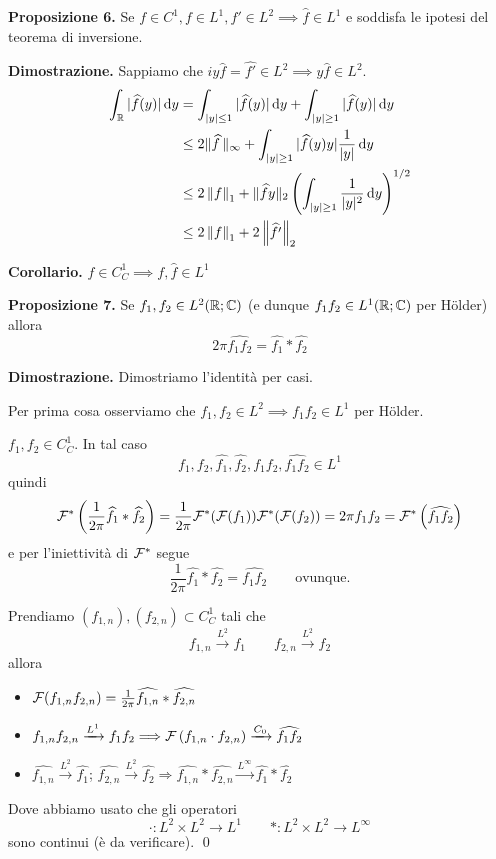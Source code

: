 \newpage

\textbf{Proposizione 6.}
Se $f \in C^1, f \in L^1, f' \in L^2 \implies \hat f \in L^1$ e soddisfa le ipotesi del teorema di inversione.

\textbf{Dimostrazione.}
Sappiamo che $iy \hat f = \hat{f'} \in L^2 \implies y \hat f \in L^2$.
$$
\begin{aligned}
	\int_{\mathbb R} |\widehat f(y)| \,\mathrm{d} y 
	& = \int_{|y| \leq 1} |\widehat f(y)| \,\mathrm{d} y + \int_{|y| \geq 1} |\widehat f(y)| \,\mathrm{d} y \\
	& \leq 2 \| \widehat f\, \|_\infty + \int_{|y| \geq 1} |\widehat f(y) y| \frac{1}{|y|} \,\mathrm{d} y \\
	& \leq 2 \left\lVert f \right\rVert_1 + \| \widehat f y \|_2 \left( \int_{|y| \geq 1} \frac{1}{|y|^2} \,\mathrm{d} y \right)^{1/2} \\
	& \leq 2 \left\lVert f \right\rVert_1 + 2 \left\lVert \widehat{f'} \right\rVert_2
\end{aligned}
$$

\textbf{Corollario.}
$f \in C_C^1 \implies f, \hat f \in L^1$

\textbf{Proposizione 7.}
Se $f_1, f_2 \in L^2(\mathbb R; \mathbb C)$ (e dunque $f_1 f_2 \in L^1(\mathbb R; \mathbb C)$ per H\"older) allora
$$
2\pi \hat{f_1 f_2} = \hat{f_1} \ast \hat{f_2}
$$

\textbf{Dimostrazione.} Dimostriamo l'identità per casi.

Per prima cosa osserviamo che $f_1, f_2 \in L^2 \implies f_1 f_2 \in L^1$ per H\"older. 

 $f_1,f_2 \in C_C^1$. In tal caso
$$
	f_1,f_2,\hat{f_1},\hat{f_2},f_1f_2,\hat{f_1f_2} \in L^1
$$
quindi
$$
	\mathcal{F}^* \left( \frac{1}{2\pi} \widehat{f_1} \ast \widehat{f_2} \right) = \frac{1}{2\pi} \mathcal{F}^*(\mathcal{F}(f_1))\mathcal{F}^*(\mathcal{F}(f_2)) = 2\pi f_1 f_2 = \mathcal{F}^* \left( \widehat{f_1f_2} \right)
$$
e per l'iniettività di $\mathcal{F}^*$ segue
$$
	\frac{1}{2\pi} \hat{f_1} \ast \hat{f_2} = \hat{f_1f_2} \qquad \text{ovunque}.
$$

 Prendiamo $(f_{1,n}), (f_{2,n}) \subset C_C^1$ tali che 
$$
	f_{1,n} \xrightarrow{L^2} f_1 \qquad f_{2,n} \xrightarrow{L^2} f_2
$$
allora
\begin{itemize}

	\item $\mathcal{F}(f_{1,n} f_{2,n}) = \frac{1}{2\pi} \widehat{f_{1,n}} \ast \widehat{f_{2,n}}$

	\item $f_{1,n} f_{2,n} \xrightarrow{L^1} f_1 f_2 \Longrightarrow \mathcal{F}\left( f_{1,n} \cdot f_{2,n} \right) \xrightarrow{C_0} \widehat{f_1 f_2}$

	\item $\hat{f_{1,n}} \xrightarrow{L^2} \hat{f_1}$; $\hat{f_{2,n}} \xrightarrow{L^2} \hat{f_2} \Longrightarrow \hat{f_{1,n}} \ast \hat{f_{2,n}} \xrightarrow{L^\infty} \hat{f_1} \ast \hat{f_2}$

\end{itemize}
Dove abbiamo usato che gli operatori
$$
	\cdot \colon L^2 \times L^2 \longrightarrow L^1 \qquad \ast \colon L^2 \times L^2 \longrightarrow L^\infty
$$
sono continui (è da verificare). \qed

